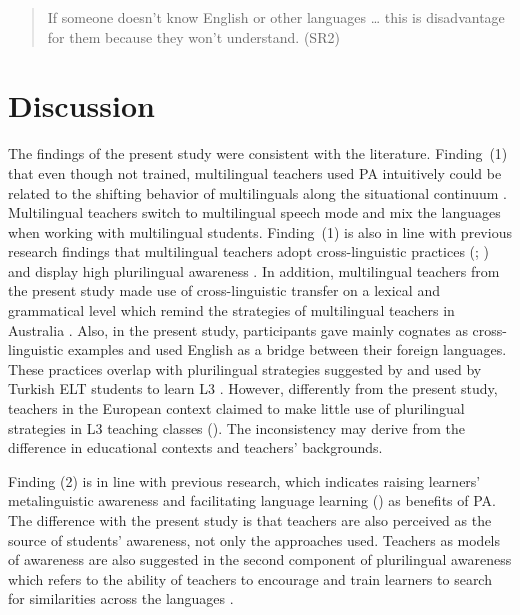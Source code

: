 \documentclass[output=paper]{../langscibook}
\begin{document}
\begin{quote}
If someone doesn’t know English or other languages … this is disadvantage for them because they won’t understand. (SR2)
\end{quote}


\section{Discussion}
The findings of the present study were consistent with the literature. Finding~(1) that even though not trained, multilingual teachers used PA intuitively could be related to the shifting behavior of multilinguals along the situational continuum \citep{Grosjean2008}. Multilingual teachers switch to multilingual speech mode and mix the languages when working with multilingual students.  Finding~(1) is also in line with previous research findings that multilingual teachers adopt cross-linguistic practices (\citealt{Ellis2004,Ellis2013}; \citealt{HigginsPonte2017}) and display high plurilingual awareness \citep{Otwinowska2014}. In addition, multilingual teachers from the present study made use of cross-linguistic transfer on a lexical and grammatical level which remind the strategies of multilingual teachers in Australia \citep{Ellis2004}. Also, in the present study, participants gave mainly cognates as cross-linguistic examples and used English as a bridge between their foreign languages. These practices overlap with plurilingual strategies suggested by \citet{Otwinowska2014} and used by Turkish ELT students to learn L3 \citep{Korkmaz2013}. However, differently from the present study, teachers in the European context claimed to make little use of plurilingual strategies in L3 teaching classes (\citealt{GöbelVieluf2014}). The inconsistency may derive from the difference in educational contexts and teachers’ backgrounds.

Finding (2) is in line with previous research, which indicates raising learners’ metalinguistic awareness \citep{JessnerEtAl2016} and facilitating language learning (\citealt{BonoStratilaki2009}) as benefits of PA. The difference with the present study is that teachers are also perceived as the source of students’ awareness, not only the approaches used. Teachers as models of awareness are also suggested in the second component of plurilingual awareness which refers to the ability of teachers to encourage and train learners to search for similarities across the languages \citep{Otwinowska2014}.
\end{document}
